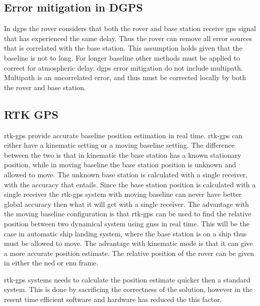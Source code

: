\subsection{Error mitigation in DGPS} \label{ss: Error mitigation DGPS}
In \gls{dgps} the rover considers that both the rover and base station receive \gls{gps} signal that has experienced the same delay. Thus the rover can remove all error sources that is correlated with the base station. This assumption holds given that the baseline is not to long. For longer baseline other methods must be applied to correct for atmospheric delay. \gls{dgps} error mitigation do not include multipath. Multipath is an uncorrelated error, and thus must be corrected locally by both the rover and base station.


\subsection{RTK GPS}\label{ss:rtk-gps}
\gls{rtk-gps} provide accurate baseline position estimation in real time. \gls{rtk-gps} can either have a kinematic setting or a moving baseline setting. The difference between the two is that in kinematic the base station has a known stationary position, while in moving baseline the base station position is unknown and allowed to move. The unknown base station is calculated with a single receiver, with the accuracy that entails. Since the base station position is calculated with a single receiver the \gls{rtk-gps} system with moving baseline can never have better global accuracy then what it will get with a single receiver. The advantage with the moving baseline configuration is that \gls{rtk-gps} can be used to find the relative position between two dynamical system using \gls{gnss} in real time. This will be the case in automatic ship landing system, where the base station is on a ship thus must be allowed to move. The advantage with kinematic mode is that it can give a more accurate position estimate. The relative position of the rover can be given in either the \gls{ned} or {enu} frame.

\gls{rtk-gps} systems needs to calculate the position estimate quicker then a standard  system. This is done by sacrificing the correctness of the solution, however in the resent time efficient software and hardware has reduced the this factor.

\cleardoublepage